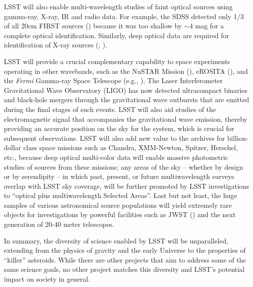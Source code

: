 LSST will also enable multi-wavelength studies of faint optical
sources using gamma-ray, X-ray, IR and radio data.  For example, the
SDSS detected only 1/3 of all 20cm FIRST sources (\cite{Becker1995})
because it was too shallow by $\sim$4 mag for a complete optical
identification. Similarly, deep optical data are required for
identification of X-ray sources (\cite{Brandt2005}; \cite{Brandt2017}).

LSST will provide a crucial complementary capability to space
experiments operating in other wavebands, such as the
NuSTAR Mission (\cite{Harrison2013}),
eROSITA (\cite{Merloni2012}),
and the {\it Fermi}
Gamma-ray Space Telescope (e.g., \cite{Atwood2010}).
The Laser Interferometer Gravitational
Wave Observatory (LIGO) has now detected ultracompact binaries and black-hole mergers through the
gravitational wave outbursts that are emitted during the final stages of such events.
LSST will also aid studies of  the electromagnetic signal that accompanies the gravitational wave emission,
thereby providing an accurate position on the sky for the system, which is
crucial for subsequent observations. LSST will also add new value to the archives for
billion-dollar class space missions such as Chandra, XMM-Newton, Spitzer, Herschel,
etc., because deep optical multi-color data will enable
massive photometric  studies of sources from these missions;
any areas of the sky -- whether by design or by serendipity -- in which past, present, or future
multiwavelength surveys overlap with LSST sky coverage, will be further promoted by LSST
investigations to ``optical plus multiwavelength Selected Areas''.
Last but not least, the huge samples of various astronomical source
populations will yield extremely rare objects for investigations by powerful
facilities such as JWST (\cite{Gardner2006}) and the next generation
of 20-40 meter telescopes.

In summary, the diversity of science enabled by LSST will be
unparalleled, extending from the physics of gravity and the
early Universe to the properties of ``killer'' asteroids. While
there are other projects that aim to address some of the same
science goals, no other project matches this diversity and
LSST's potential impact on society in general.
